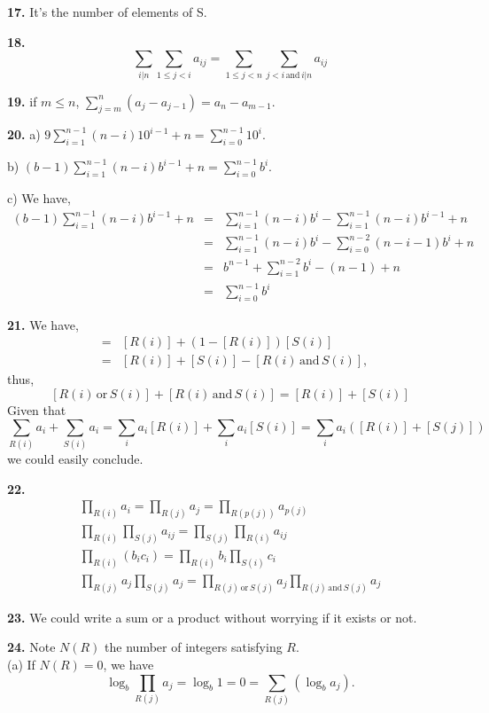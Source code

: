\documentclass[a4paper,12pt]{article}
\newcommand{\newpar}[1]{\bigskip \noindent \textbf{#1.}}
\begin{document}
\newpar{17}  It's the number of elements of S.

\newpar{18}
\[\sum_{i | n} \sum_{1 \le j < i} a_{ij} =
\sum_{1 \le j < n} \sum_{j < i\,\mathrm{and}\,i | n}a_{ij}\]

\newpar{19} if $m \le n$, $\sum_{j=m}^n(a_j-a_{j-1}) = a_n - a_{m-1}$.

\newpar{20} a) $9 \sum_{i=1}^{n-1} (n-i)10^{i-1} + n = \sum_{i=0}^{n-1}10^i$.

\medskip \noindent
b) $(b-1)\sum_{i=1}^{n-1}(n-i)b^{i-1}+n = \sum_{i=0}^{n-1}b^i$.

\medskip \noindent
c) We have,
\begin{eqnarray*}
(b-1)\sum_{i=1}^{n-1}(n-i)b^{i-1}+n &=&
\sum_{i=1}^{n-1}(n-i)b^i - \sum_{i=1}^{n-1}(n-i)b^{i-1}+n\\
&=& \sum_{i=1}^{n-1}(n-i)b^i - \sum_{i=0}^{n-2}(n-i-1)b^i+n\\
&=& b^{n-1} + \sum_{i=1}^{n-2}b^i - (n-1) + n\\
&=& \sum_{i=0}^{n-1}b^i
\end{eqnarray*}

\newpar{21} We have,
\begin{eqnarray*}
[R(i)\,\mathrm{or}\,S(i)] &=&
[R(i)]+(1-[R(i)])[S(i)]\\ &=&
[R(i)]+[S(i)]-[R(i)\,\mathrm{and}\,S(i)],
\end{eqnarray*} thus,
\[[R(i)\,\mathrm{or}\,S(i)] + [R(i)\,\mathrm{and}\,S(i)]
= [R(i)] + [S(i)]\]
Given that 
\[ \sum_{R(i)}a_i + \sum_{S(i)}a_i = 
\sum_ia_i[R(i)] + \sum_ia_i[S(i)] = 
\sum_ia_i([R(i)]+[S(j)])\]
we could easily conclude.

\newpar{22}
\begin{eqnarray}
\prod_{R(i)}a_i = \prod_{R(j)}a_j = \prod_{R(p(j))}a_{p(j)}\\
\prod_{R(i)} \prod_{S(j)}a_{ij} = \prod_{S(j)}\prod_{R(i)}a_{ij}\\
\prod_{R(i)}(b_ic_i) = \prod_{R(i)}b_i \prod_{S(i)}c_i\\
\prod_{R(j)}a_j \prod_{S(j)}a_j = \prod_{R(j)\,\mathrm{or}\,S(j)}a_j
\prod_{R(j)\,\mathrm{and}\,S(j)}a_j
\end{eqnarray}

\newpar{23} We could write a sum or a product without worrying if it
exists or not.

\newpar{24} Note $N(R)$ the number of integers satisfying $R$.\\
(a) If $N(R) = 0$, we have
\[\log_b\prod_{R(j)}a_j = \log_b 1 = 0 = \sum_{R(j)}(\log_b a_j).\]
\end{document}
